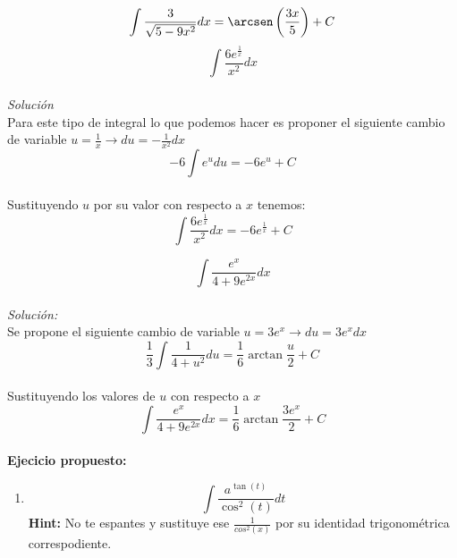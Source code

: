 \documentclass[10pt,executivepaper]{article}
\begin{document}
\[\int \frac{3}{\sqrt{5-9x^{2}}}dx = \arcsen\left(\frac{3x}{5}\right) + C\]
\vspace{1.5cm}
\clearpage
\[\int \frac{6 e^{\frac{1}{x}}}{x^{2}}dx\]\\
\textit{Solución}\\
Para este tipo de integral lo que podemos hacer es proponer el siguiente cambio de variable $u = \frac{1}{x} \rightarrow du=-\frac{1}{x^{2}}dx$\\
\[-6\int e^{u}du = -6 e^{u} + C \]\\
Sustituyendo $u$ por su valor con respecto a $x$ tenemos:\\
\[\int \frac{6 e^{\frac{1}{x}}}{x^{2}}dx=-6 e^{\frac{1}{x}} + C\]

\vspace{1cm}
\[\int\frac{e^{x}}{4 + 9 e^{2x}}dx\]
\\
\textit{Solución:}\\
Se propone el siguiente cambio de variable $u=3e^{x}\rightarrow du= 3e^{x}dx$\\
\[\frac{1}{3}\int \frac{1}{4+u^{2}}du=\frac{1}{6}\arctan{\frac{u}{2}}+C\]
\\Sustituyendo los valores de $u$ con respecto a $x$\\
\[\int\frac{e^{x}}{4 + 9 e^{2x}}dx = \frac{1}{6}\arctan{\frac{3e^{x}}{2}}+C\]\\
\textbf{Ejecicio propuesto:}\\
\begin{enumerate}
  \item \[\int \frac{a^{\tan(t)}}{\cos^{2}(t)}dt\]
  \textbf{Hint:} No te espantes y sustituye ese $\frac{1}{cos^{2}(x)}$ por su identidad trigonométrica correspodiente.
\end{enumerate}


\clearpage
\end{document}
